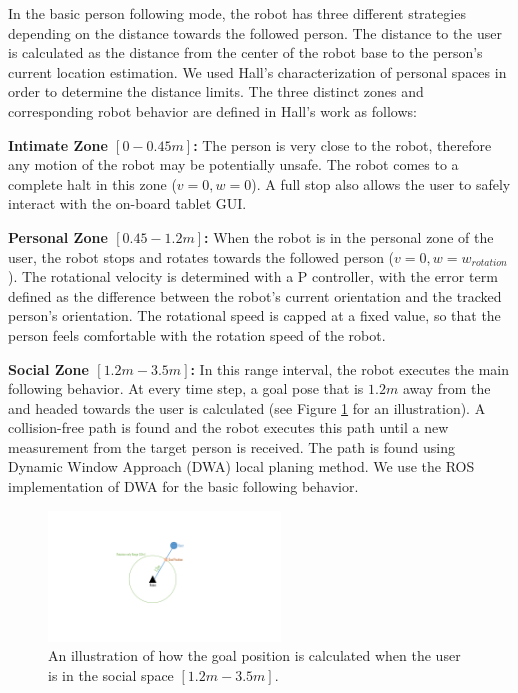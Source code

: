 In the basic person following mode, the robot has three different strategies depending on the distance towards the followed person. The distance to the user is calculated as the distance from the center of the robot base to the person's current location estimation. We used Hall's characterization of personal spaces in order to determine the distance limits. The three distinct zones and corresponding robot behavior are defined in Hall's work \cite{hall1969hidden} as follows:

\textbf{Intimate Zone $[0-0.45m]$:} The person is very close to the robot, therefore any motion of the robot may be potentially unsafe. The robot comes to a complete halt in this zone ($v=0,w=0$). A full stop also allows the user to safely interact with the on-board tablet GUI.

\textbf{Personal Zone $[0.45-1.2m]$:} When the robot is in the personal zone of the user, the robot stops and rotates towards the followed person ($v=0,w=w_{rotation}$). The rotational velocity is determined with a P controller, with the error term defined as the difference between the robot's current orientation and the tracked person's orientation. The rotational speed is capped at a fixed value, so that the person feels comfortable with the rotation speed of the robot.

\textbf{Social Zone $[1.2m-3.5m]$: } In this range interval, the robot executes the main following behavior. At every time step, a goal pose that is $1.2m$ away from the and headed towards the user is calculated (see Figure \ref{fig:following_1m} for an illustration). A collision-free path is found and the robot executes this path until a new measurement from the target person is received. The path is found using Dynamic Window Approach (DWA) local planing method. We use the ROS implementation of DWA for the basic following behavior.

\begin{figure}[h!]
\centering
\includegraphics[width=0.55\textwidth]{pics/following_1m_cropped}
\caption{An illustration of how the goal position is calculated when the user is in the social space $[1.2m-3.5m]$.}
\label{fig:following_1m}
\end{figure}


